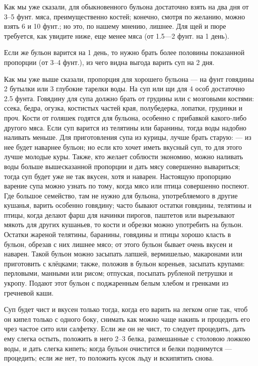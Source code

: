 Как мы уже сказали, для обыкновенного бульона достаточно взять на два дня от 3–5 фунт. мяса, преимущественно костей; конечно, смотря по желанию, можно взять 6 и 10 фунт.; но это, по нашему мнению, лишнее. Для щей и пюре требуется, как увидите ниже, еще менее мяса (от 1.5—2 фунт. на 1 день).

Если же бульон варится на 1 день, то нужно брать более половины показанной пропорции (от 3–4 фунт.), из чего видна выгода варить суп на 2 дня.

Как мы уже выше сказали, пропорция для хорошего бульона — на фунт говядины 2 бутылки или 3 глубокие тарелки воды. На суп или щи для 4 особ достаточно 2.5 фунта. Говядину для супа должно брать от грудины или с мозговыми костями: ссека, бедра, огузка, костистых частей края, полубедерка, лопатки, грудинки и проч. Кости от голяшек годятся для бульона, особенно с прибавкой какого-либо другого мяса. Если суп варится из телятины или баранины, тогда воды надобно наливать меньше. Для приготовления супа из курицы, лучше брать старую: — из нее будет наварнее бульон; но если кто хочет иметь вкусный суп, то для этого лучше молодые куры. Также, кто желает соблюсти экономию, можно наливать воды больше вышесказанной пропорции и дать мясу совершенно вывариться; тогда суп будет уже не так вкусен, хотя и наварен. Настоящую пропорцию варение супа можно узнать по тому, когда мясо или птица совершенно поспеют. Где большое семейство, там не нужно для бульона, употребляемого в другие кушанья, варить особенно говядину; часто бывают остатки говядины, телятины и птицы, когда делают фарш для начинки пирогов, паштетов или вырезывают мякоть для других кушаньев, то кости и обрезки можно употребить на бульон. Остатки жареной телятины, баранины, говядины и птицы хорошо класть в бульон, обрезав с них лишнее мясо; от этого бульон бывает очень вкусен и наварен. Такой бульон можно засыпать лапшей, вермишелью, макаронами или приготовить с клёцками; также, положив в бульон кореньев, засыпать крупами: перловыми, манными или рисом; отпуская, посыпать рубленой петрушки и укропу. Подают этот бульон с поджаренным белым хлебом и гренками из гречневой каши.

Суп будет чист и вкусен только тогда, когда его варить на легком огне так, чтоб он кипел только с одного боку, снимать как можно чаще накипь и процедить его чрез частое сито или салфетку. Если же он не чист, то следует процедить, дать ему слегка остыть, положить в него 2–3 белка, размешанные с столовою ложкою воды, и дать слегка кипеть; когда бульон очистится и белки поднимутся — процедить; если же нет, то положить кусок льду и вскипятить снова.

